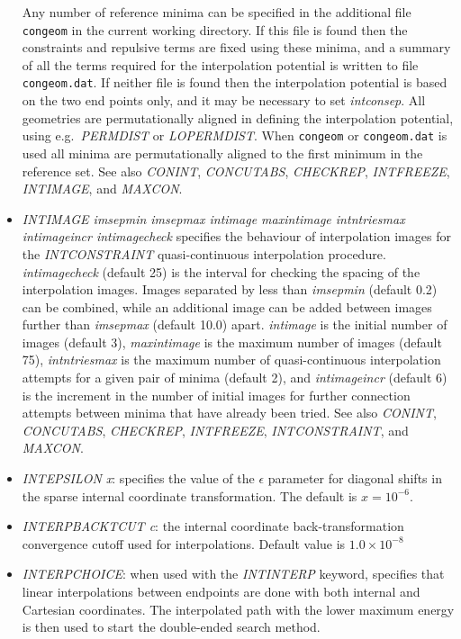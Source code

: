 \documentclass[12pt,a4paper,dvips]{article}
\begin{document}
\begin{itemize}
Any number of reference minima can be specified in the additional file {\tt congeom}
in the current working directory. If this file is found then the constraints and
repulsive terms are fixed using these minima, and a summary of all the terms required
for the interpolation potential is written to file {\tt congeom.dat}.
If neither file is found then the interpolation potential is based on the two end points only,
and it may be necessary to set {\it intconsep\/}.
All geometries are permutationally aligned in defining the interpolation potential,
using e.g.~{\it PERMDIST\/} or {\it LOPERMDIST\/}. When {\tt congeom} or {\tt congeom.dat}
is used all minima are permutationally aligned to the first minimum in the reference set.
See also
{\it CONINT\/},
{\it CONCUTABS\/},
{\it CHECKREP\/},
{\it INTFREEZE\/},
{\it INTIMAGE\/}, and
{\it MAXCON\/}.

\item {\it INTIMAGE imsepmin imsepmax intimage maxintimage intntriesmax intimageincr intimagecheck\/}
specifies the behaviour of interpolation images for the {\it INTCONSTRAINT\/} 
quasi-continuous interpolation procedure.
{\it intimagecheck\/} (default 25) is the interval for checking the spacing of the interpolation images.
Images separated by less than {\it imsepmin\/} (default 0.2) can be combined, while an
additional image can be added between images further than {\it imsepmax\/} (default 10.0) apart.
{\it intimage\/} is the initial number of images (default 3),
{\it maxintimage\/} is the maximum number of images (default 75),
{\it intntriesmax\/} is the maximum number of quasi-continuous interpolation
attempts for a given pair of minima (default 2), and
{\it intimageincr\/} (default 6) is the increment in the number of initial images for 
further connection attempts between minima that have already been tried.
See also
{\it CONINT\/},
{\it CONCUTABS\/},
{\it CHECKREP\/},
{\it INTFREEZE\/},
{\it INTCONSTRAINT\/}, and
{\it MAXCON\/}.

\item {\it INTEPSILON x\/}: specifies the value of the $\epsilon$ parameter
for diagonal shifts in the sparse internal coordinate transformation.
The default is $x=10^{-6}$.

\item {\it INTERPBACKTCUT c\/}: the internal coordinate back-transformation
  convergence cutoff used for interpolations. Default
  value is $1.0\times10^{-8}$

\item {\it INTERPCHOICE\/}: when used with the {\it INTINTERP\/} keyword,
  specifies that linear interpolations between endpoints are done with both
  internal and Cartesian coordinates. The interpolated path with the lower
  maximum energy is then used to start the double-ended search method.


\end{itemize}
\end{document}
